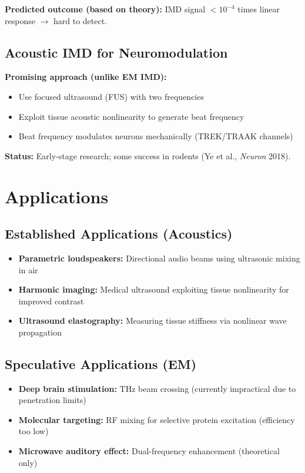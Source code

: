 \textbf{Predicted outcome (based on theory):} IMD signal $<10^{-4}$ times linear response $\rightarrow$ hard to detect.

\subsection{Acoustic IMD for Neuromodulation}

\textbf{Promising approach (unlike EM IMD):}
\begin{itemize}
\item Use focused ultrasound (FUS) with two frequencies
\item Exploit tissue acoustic nonlinearity to generate beat frequency
\item Beat frequency modulates neurons mechanically (TREK/TRAAK channels)
\end{itemize}

\textbf{Status:} Early-stage research; some success in rodents (Ye et al., \emph{Neuron} 2018).

\section{Applications}

\subsection{Established Applications (Acoustics)}

\begin{itemize}
\item \textbf{Parametric loudspeakers:} Directional audio beams using ultrasonic mixing in air
\item \textbf{Harmonic imaging:} Medical ultrasound exploiting tissue nonlinearity for improved contrast
\item \textbf{Ultrasound elastography:} Measuring tissue stiffness via nonlinear wave propagation
\end{itemize}

\subsection{Speculative Applications (EM)}

\begin{itemize}
\item \textbf{Deep brain stimulation:} THz beam crossing (currently impractical due to penetration limits)
\item \textbf{Molecular targeting:} RF mixing for selective protein excitation (efficiency too low)
\item \textbf{Microwave auditory effect:} Dual-frequency enhancement (theoretical only)
\end{itemize}

